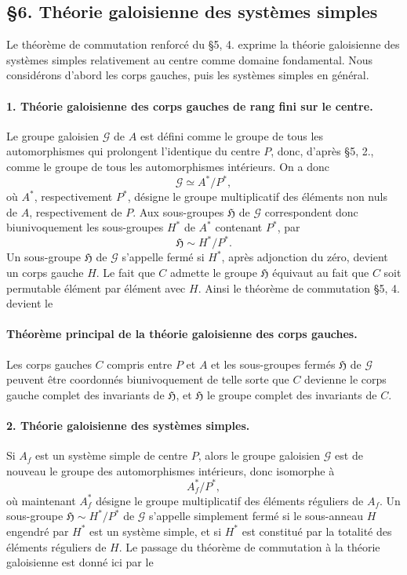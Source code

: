 \providecommand{\Gcal}{\mathcal G}

\subsection*{\S 6. Théorie galoisienne des systèmes simples}

Le théorème de commutation renforcé du \S 5, 4. exprime la théorie galoisienne des systèmes simples relativement au centre comme domaine fondamental. Nous considérons d'abord les corps gauches, puis les systèmes simples en général.

\paragraph{1. Théorie galoisienne des corps gauches de rang fini sur le centre.}
Le groupe galoisien \(\Gcal\) de \(A\) est défini comme le groupe de tous les automorphismes qui prolongent l'identique du centre \(P\), donc, d'après \S 5, 2., comme le groupe de tous les automorphismes intérieurs. On a donc
\[
        \Gcal \simeq A^*/P^*,
\]
où \(A^*\), respectivement \(P^*\), désigne le groupe multiplicatif des éléments non nuls de \(A\), respectivement de \(P\). Aux sous-groupes \(\mathfrak H\) de \(\Gcal\) correspondent donc biunivoquement les sous-groupes \(H^*\) de \(A^*\) contenant \(P^*\), par
\[
        \mathfrak H \sim H^*/P^* .
\]
Un sous-groupe \(\mathfrak H\) de \(\Gcal\) s'appelle fermé si \(H^*\), après adjonction du zéro, devient un corps gauche \(H\). Le fait que \(C\) admette le groupe \(\mathfrak H\) équivaut au fait que \(C\) soit permutable élément par élément avec \(H\). Ainsi le théorème de commutation \S 5, 4. devient le

\paragraph{Théorème principal de la théorie galoisienne des corps gauches.}
Les corps gauches \(C\) compris entre \(P\) et \(A\) et les sous-groupes fermés \(\mathfrak H\) de \(\Gcal\) peuvent être coordonnés biunivoquement de telle sorte que \(C\) devienne le corps gauche complet des invariants de \(\mathfrak H\), et \(\mathfrak H\) le groupe complet des invariants de \(C\).

\paragraph{2. Théorie galoisienne des systèmes simples.}
Si \(A_f\) est un système simple de centre \(P\), alors le groupe galoisien \(\Gcal\) est de nouveau le groupe des automorphismes intérieurs, donc isomorphe à
\[
        A_f^*/P^*,
\]
où maintenant \(A_f^*\) désigne le groupe multiplicatif des éléments réguliers de \(A_f\). Un sous-groupe \(\mathfrak H\sim H^*/P^*\) de \(\Gcal\) s'appelle simplement fermé si le sous-anneau \(H\) engendré par \(H^*\) est un système simple, et si \(H^*\) est constitué par la totalité des éléments réguliers de \(H\). Le passage du théorème de commutation à la théorie galoisienne est donné ici par le

